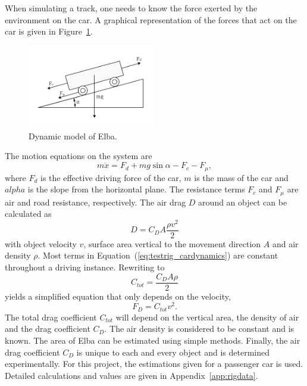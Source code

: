 When simulating a track, one needs to know the force exerted by the environment
on the car. A graphical representation of the forces that act on the car is
given in Figure~\ref{fig:testrig_elbadynamics}.
\begin{figure}[H]
    \label{fig:testrig_elbadynamics}
    \centering
    \includegraphics[width=0.5\textwidth]{./img/testrig_elbaforces.png}
    \caption{Dynamic model of Elba.}
\end{figure}
The motion equations on the system are 
\begin{equation} \label{eq:testrig_cardynamics}
    m\ddot{x} = F_d + mg\sin{\alpha} - F_c - F_{\mu},
\end{equation}
where $F_d$ is the effective driving force of the car, $m$ is the mass of the
car and $alpha$ is the slope from the horizontal plane. The resistance terms
$F_c$ and $F_{\mu}$ are air and road resistance, respectively. The air drag $D$
around an object can be calculated as \cite{nakayama2002}
\begin{equation} \label{eq:testrig_airdrag}
    D = C_D A \frac{\rho v^2} {2}
\end{equation}
with object velocity $v$, surface area vertical to the movement direction $A$
and air density $\rho$. Most terms in Equation~(\ref{eq:testrig_cardynamics})
are constant throughout a driving instance. Rewriting to
\begin{equation} \label{eq:testrig_csimple}
    C_{tot} = \frac{C_D A \rho} {2}
\end{equation}
yields a simplified equation that only depends on the velocity,
\begin{equation} \label{eq:drag}
    F_D = C_{tot}v^2.
\end{equation}
The total drag coefficient $C_{tot}$ will depend on the vertical area, the density of
air and the drag coefficient $C_D$. The air density is considered to be constant
and is known. The area of Elba can be estimated using simple methods. Finally,
the air drag coefficient $C_D$ is unique to each and every object and is
determined experimentally. For this project, the estimations given for a
passenger car is used. Detailed calculations and values are given in
Appendix~\ref{app:rigdata}. 

